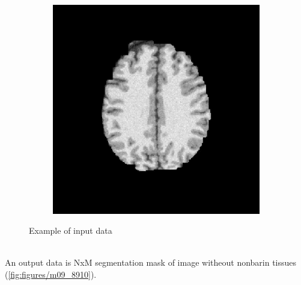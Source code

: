 \begin{figure}[H]
\begin{subfigure}[b]{0.25\linewidth}
	\end{subfigure}
	\begin{subfigure}[b]{0.25\linewidth}
		\includegraphics[width=\linewidth]{figures/Module_09/m09_7}
	\end{subfigure}
	\caption{Example of input data} 
	\label{fig:figures/m09_567}
\end{figure} \\

An output data is NxM segmentation mask of image witheout nonbarin tissues (\ref{fig:figures/m09_8910}). \\

